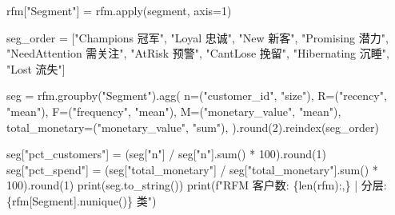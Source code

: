 \documentclass[
]{ctexart}
\newenvironment{Shaded}{\begin{snugshade}}{\end{snugshade}}
\newcommand{\BuiltInTok}[1]{\textcolor[rgb]{0.00,0.23,0.31}{#1}}
\newcommand{\DecValTok}[1]{\textcolor[rgb]{0.68,0.00,0.00}{#1}}
\newcommand{\NormalTok}[1]{\textcolor[rgb]{0.00,0.23,0.31}{#1}}
\newcommand{\OperatorTok}[1]{\textcolor[rgb]{0.37,0.37,0.37}{#1}}
\newcommand{\SpecialCharTok}[1]{\textcolor[rgb]{0.37,0.37,0.37}{#1}}
\newcommand{\SpecialStringTok}[1]{\textcolor[rgb]{0.13,0.47,0.30}{#1}}
\newcommand{\StringTok}[1]{\textcolor[rgb]{0.13,0.47,0.30}{#1}}
\begin{document}
\begin{Shaded}
\begin{Highlighting}[]
\NormalTok{rfm[}\StringTok{"Segment"}\NormalTok{] }\OperatorTok{=}\NormalTok{ rfm.}\BuiltInTok{apply}\NormalTok{(segment, axis}\OperatorTok{=}\DecValTok{1}\NormalTok{)}

\NormalTok{seg\_order }\OperatorTok{=}\NormalTok{ [}\StringTok{"Champions 冠军"}\NormalTok{, }\StringTok{"Loyal 忠诚"}\NormalTok{, }\StringTok{"New 新客"}\NormalTok{, }\StringTok{"Promising 潜力"}\NormalTok{,}
             \StringTok{"NeedAttention 需关注"}\NormalTok{, }\StringTok{"AtRisk 预警"}\NormalTok{, }\StringTok{"CantLose 挽留"}\NormalTok{, }\StringTok{"Hibernating 沉睡"}\NormalTok{, }\StringTok{"Lost 流失"}\NormalTok{]}

\NormalTok{seg }\OperatorTok{=}\NormalTok{ rfm.groupby(}\StringTok{"Segment"}\NormalTok{).agg(}
\NormalTok{    n}\OperatorTok{=}\NormalTok{(}\StringTok{"customer\_id"}\NormalTok{, }\StringTok{"size"}\NormalTok{),}
\NormalTok{    R}\OperatorTok{=}\NormalTok{(}\StringTok{"recency"}\NormalTok{, }\StringTok{"mean"}\NormalTok{),}
\NormalTok{    F}\OperatorTok{=}\NormalTok{(}\StringTok{"frequency"}\NormalTok{, }\StringTok{"mean"}\NormalTok{),}
\NormalTok{    M}\OperatorTok{=}\NormalTok{(}\StringTok{"monetary\_value"}\NormalTok{, }\StringTok{"mean"}\NormalTok{),}
\NormalTok{    total\_monetary}\OperatorTok{=}\NormalTok{(}\StringTok{"monetary\_value"}\NormalTok{, }\StringTok{"sum"}\NormalTok{),}
\NormalTok{).}\BuiltInTok{round}\NormalTok{(}\DecValTok{2}\NormalTok{).reindex(seg\_order)}

\NormalTok{seg[}\StringTok{"pct\_customers"}\NormalTok{] }\OperatorTok{=}\NormalTok{ (seg[}\StringTok{"n"}\NormalTok{] }\OperatorTok{/}\NormalTok{ seg[}\StringTok{"n"}\NormalTok{].}\BuiltInTok{sum}\NormalTok{() }\OperatorTok{*} \DecValTok{100}\NormalTok{).}\BuiltInTok{round}\NormalTok{(}\DecValTok{1}\NormalTok{)}
\NormalTok{seg[}\StringTok{"pct\_spend"}\NormalTok{] }\OperatorTok{=}\NormalTok{ (seg[}\StringTok{"total\_monetary"}\NormalTok{] }\OperatorTok{/}\NormalTok{ seg[}\StringTok{"total\_monetary"}\NormalTok{].}\BuiltInTok{sum}\NormalTok{() }\OperatorTok{*} \DecValTok{100}\NormalTok{).}\BuiltInTok{round}\NormalTok{(}\DecValTok{1}\NormalTok{)}
\BuiltInTok{print}\NormalTok{(seg.to\_string())}
\BuiltInTok{print}\NormalTok{(}\SpecialStringTok{f"RFM 客户数: }\SpecialCharTok{\{}\BuiltInTok{len}\NormalTok{(rfm)}\SpecialCharTok{:,\}}\SpecialStringTok{ | 分层: }\SpecialCharTok{\{}\NormalTok{rfm[}\StringTok{\textquotesingle{}Segment\textquotesingle{}}\NormalTok{]}\SpecialCharTok{.}\NormalTok{nunique()}\SpecialCharTok{\}}\SpecialStringTok{ 类"}\NormalTok{)}


\end{Highlighting}
\end{Shaded}
\end{document}
